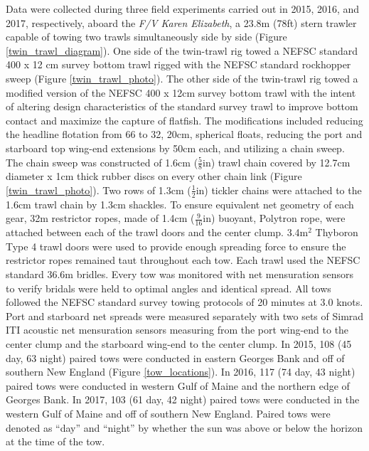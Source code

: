 \documentclass[
  12pt,
]{article}
\begin{document}
Data were collected during three field experiments carried out in 2015,
2016, and 2017, respectively, aboard the \emph{F/V Karen Elizabeth}, a
23.8m (78ft) stern trawler capable of towing two trawls simultaneously
side by side (Figure \ref{twin_trawl_diagram}). One side of the
twin-trawl rig towed a NEFSC standard 400 x 12 cm survey bottom trawl
rigged with the NEFSC standard rockhopper sweep \citep{politisetal14}
(Figure \ref{twin_trawl_photo}). The other side of the twin-trawl rig
towed a modified version of the NEFSC 400 x 12cm survey bottom trawl
with the intent of altering design characteristics of the standard
survey trawl to improve bottom contact and maximize the capture of
flatfish. The modifications included reducing the headline flotation
from 66 to 32, 20cm, spherical floats, reducing the port and starboard
top wing-end extensions by 50cm each, and utilizing a chain sweep. The
chain sweep was constructed of 1.6cm (\(\frac{5}{8}\)in) trawl chain
covered by 12.7cm diameter x 1cm thick rubber discs on every other chain
link (Figure \ref{twin_trawl_photo}). Two rows of 1.3cm
(\(\frac{1}{2}\)in) tickler chains were attached to the 1.6cm trawl
chain by 1.3cm shackles. To ensure equivalent net geometry of each gear,
32m restrictor ropes, made of 1.4cm (\(\frac{9}{16}\)in) buoyant,
Polytron rope, were attached between each of the trawl doors and the
center clump. 3.4m\(^2\) Thyboron Type 4 trawl doors were used to
provide enough spreading force to ensure the restrictor ropes remained
taut throughout each tow. Each trawl used the NEFSC standard 36.6m
bridles. Every tow was monitored with net mensuration sensors to verify
bridals were held to optimal angles and identical spread. All tows
followed the NEFSC standard survey towing protocols of 20 minutes at 3.0
knots. Port and starboard net spreads were measured separately with two
sets of Simrad ITI acoustic net mensuration sensors measuring from the
port wing-end to the center clump and the starboard wing-end to the
center clump. In 2015, 108 (45 day, 63 night) paired tows were conducted
in eastern Georges Bank and off of southern New England (Figure
\ref{tow_locations}). In 2016, 117 (74 day, 43 night) paired tows were
conducted in western Gulf of Maine and the northern edge of Georges
Bank. In 2017, 103 (61 day, 42 night) paired tows were conducted in the
western Gulf of Maine and off of southern New England. Paired tows were
denoted as ``day'' and ``night'' by whether the sun was above or below
the horizon at the time of the tow.
\end{document}
